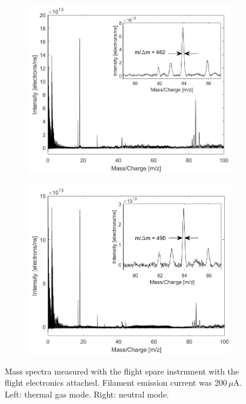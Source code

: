 		\begin{figure}[h]
			\begin{subfigure}{0.5\textwidth}
				\centering
				\includegraphics[width = \textwidth]{Experiments/FSthMode200uA.png}
			\end{subfigure}
			\begin{subfigure}{0.5\textwidth}
				\centering
				\includegraphics[width = \textwidth]{Experiments/FSnMode200uA.png}
			\end{subfigure}
			\caption{Mass spectra measured with the flight spare instrument with the flight electronics attached. Filament emission current was 200\,$\mu$A. Left: thermal gas mode. Right: neutral mode.}
			\label{fig:ExpFSFlightElMassRes}
		\end{figure}
		

